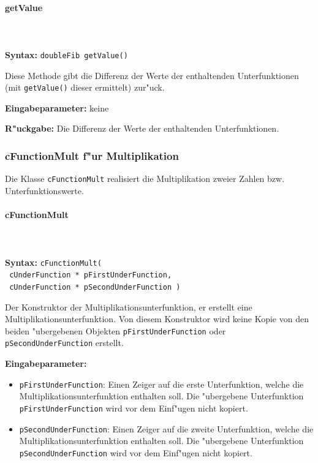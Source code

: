\paragraph{getValue}

\ \\\\\noindent
\textbf{Syntax:} \verb|doubleFib getValue()|

\bigskip\noindent
Diese Methode gibt die Differenz der Werte der enthaltenden Unterfunktionen (mit \verb|getValue()| dieser ermittelt) zur"uck.

\bigskip\noindent
\textbf{Eingabeparameter:} keine

\bigskip\noindent
\textbf{R"uckgabe:} Die Differenz der Werte der enthaltenden Unterfunktionen.


\subsubsection{cFunctionMult f"ur Multiplikation}

Die Klasse \verb|cFunctionMult| realisiert die Multiplikation zweier Zahlen bzw. Unterfunktionswerte.

\paragraph{cFunctionMult}

\ \\\\\noindent
\textbf{Syntax:} \verb|cFunctionMult(| \\\verb| cUnderFunction * pFirstUnderFunction,| \\\verb| cUnderFunction * pSecondUnderFunction )|

\bigskip\noindent
Der Konstruktor der Multiplikationsunterfunktion, er erstellt eine Multiplikationsunterfunktion. Von diesem Konstruktor wird keine Kopie von den beiden "ubergebenen Objekten \verb|pFirstUnderFunction| oder \verb|pSecondUnderFunction| erstellt.

\bigskip\noindent
\textbf{Eingabeparameter:}
\begin{itemize}
 \item \verb|pFirstUnderFunction|: Einen Zeiger auf die erste Unterfunktion, welche die Multiplikationsunterfunktion enthalten soll. Die "ubergebene Unterfunktion \verb|pFirstUnderFunction| wird vor dem Einf"ugen nicht kopiert.
 \item \verb|pSecondUnderFunction|: Einen Zeiger auf die zweite Unterfunktion, welche die Multiplikationsunterfunktion enthalten soll. Die "ubergebene Unterfunktion \verb|pSecondUnderFunction| wird vor dem Einf"ugen nicht kopiert.
\end{itemize}


